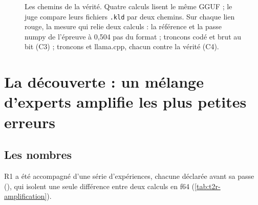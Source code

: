 \begin{figure}[ht]
\centering
\SchemaRefChemins
\caption[Les chemins de la vérité]{Les chemins de la vérité. Quatre calculs lisent le même GGUF ; le juge compare leurs fichiers \texttt{.kld} par deux chemins. Sur chaque lien rouge, la mesure qui relie deux calculs : la référence et la passe numpy de l'épreuve à 0,504 pas du format ; troncons codé et brut au bit (C3) ; troncons et llama.cpp, chacun contre la vérité (C4).}
\label{fig:t2r-chemins}
\end{figure}

\section{La découverte : un mélange d'experts amplifie les plus petites erreurs}\label{sec:t2r-amplification}

\subsection{Les nombres}

R1 a été accompagné d'une série d'expériences, chacune déclarée avant sa passe (), qui isolent une seule différence entre deux calculs en f64 (\cref{tab:t2r-amplification}).

